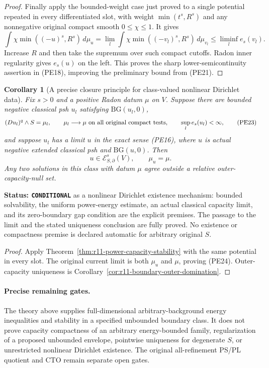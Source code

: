 \documentclass[11pt,a4paper]{article}
\numberwithin{equation}{section}
\newtheorem{corollary}[theorem]{Corollary}
\theoremstyle{definition}
\theoremstyle{remark}
\begin{document}
\begin{proof}
Finally apply the bounded-weight case just proved to a single
potential repeated in every differentiated slot, with weight
$\min(t^s,R^s)$ and any nonnegative original compact smooth
$0\leq\chi\leq1$. It gives
\[
 \int\chi\min((-u)^s,R^s)\,d\mu_u
  =\lim_l\int\chi\min((-v_l)^s,R^s)\,d\mu_{v_l}
                         \leq\liminf_l e_s(v_l).
\]
Increase $R$ and then take the supremum over such compact
cutoffs. Radon inner regularity gives $e_s(u)$ on the left.
This proves the sharp lower-semicontinuity assertion in (PE18),
improving the preliminary bound from (PE21).
\end{proof}

\begin{corollary}[A precise closure principle for class-valued nonlinear Dirichlet data]
\label{cor:r11-power-Dirichlet-closure}
Fix $s>0$ and a positive Radon datum $\mu$ on $V$. Suppose there
are bounded negative classical psh $u_l$ satisfying
$\mathrm{BG}(u_l,0)$,
\[
 (Du_l)^q\wedge S=\mu_l,\qquad
 \mu_l\longrightarrow\mu\ \hbox{on all original compact tests},
 \qquad\sup_l e_s(u_l)<\infty,
 \tag{PE23}
\]
and suppose $u_l$ has a limit $u$ in the exact sense (PE16),
where $u$ is actual negative extended classical psh and
$\mathrm{BG}(u,0)$. Then
\[
                    u\in\mathcal E^s_{S,\partial}(V),
                    \qquad\mu_u=\mu.
 \tag{PE24}
\]
Any two solutions in this class with datum $\mu$ agree outside
a relative outer-capacity-null set.
\end{corollary}

\noindent\textbf{Status: \texttt{CONDITIONAL}} as a nonlinear
Dirichlet existence mechanism: bounded solvability, the uniform
power-energy estimate, an actual classical capacity limit, and
its zero-boundary gap condition are the explicit premises.
The passage to the limit and the stated uniqueness conclusion
are fully proved. No existence or compactness premise is declared
automatic for arbitrary original $S$.

\begin{proof}
Apply Theorem~\ref{thm:r11-power-capacity-stability} with the
same potential in every slot. The original current limit is
both $\mu_u$ and $\mu$, proving (PE24). Outer-capacity uniqueness
is Corollary~\ref{cor:r11-boundary-outer-domination}.
\end{proof}

\paragraph{Precise remaining gates.}
The theory above supplies full-dimensional arbitrary-background
energy inequalities and stability in a specified unbounded
boundary class. It does not prove capacity compactness of an
arbitrary energy-bounded family, regularization of a proposed
unbounded envelope, pointwise uniqueness for degenerate $S$,
or unrestricted nonlinear Dirichlet existence. The original
all-refinement PS/PL quotient and CTO remain separate open gates.
\end{document}
